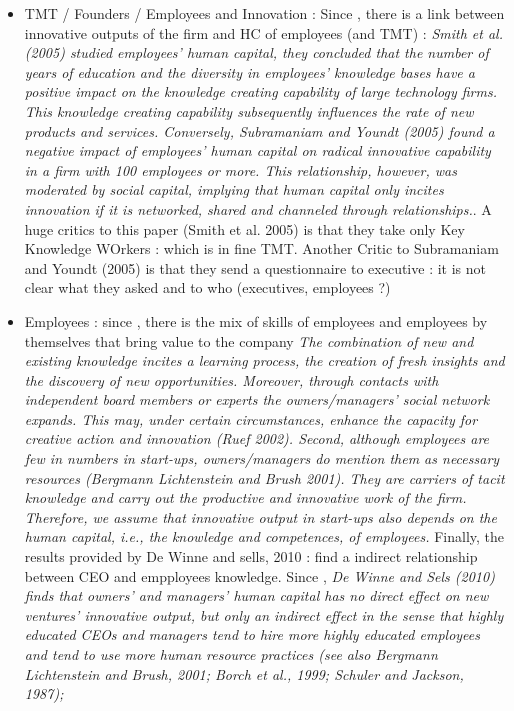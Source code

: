 \begin{itemize}
  \item TMT / Founders / Employees and Innovation : Since \citep{de2010interrelationships}, there is a link between innovative outputs of the firm and HC of employees (and TMT) : \textit{Smith et al. (2005) studied employees’ human capital, they concluded that the number of years of education and the diversity in employees’ knowledge bases have a positive impact on the knowledge creating capability of large technology firms. This knowledge creating capability subsequently influences the rate of new products and services. Conversely, Subramaniam and Youndt (2005) found a negative impact of employees’ human capital on radical innovative capability in a firm with 100 employees or more. This relationship, however, was moderated by social capital, implying that human capital only incites innovation if it is networked, shared and channeled through relationships.}. A huge critics to this paper (Smith et al. 2005) is that they take only Key Knowledge WOrkers : which is in fine TMT. Another Critic to Subramaniam and Youndt (2005) is that they send a questionnaire to executive : it is not clear what they asked and to who (executives, employees ?)\\

  \item Employees : since \citep{de2010interrelationships}, there is the mix of skills of employees and employees by themselves that bring value to the company \textit{The combination of new and existing knowledge incites a learning process, the creation of fresh insights and the discovery of new opportunities. Moreover, through contacts with independent board members or experts the owners/managers’ social network expands. This may, under certain circumstances, enhance the capacity for creative action and innovation (Ruef 2002). Second, although employees are few in numbers in start-ups, owners/managers do mention them as necessary resources (Bergmann Lichtenstein and Brush 2001). They are carriers of tacit knowledge and carry out the productive and innovative work of the firm. Therefore, we assume that innovative output in start-ups also depends on the human capital, i.e., the knowledge and competences, of employees.} Finally, the results provided by De Winne and sells, 2010 : find a indirect relationship between CEO and empployees knowledge. Since \cite{andries2014small}, \textit{De Winne and Sels (2010) finds that owners’ and managers’ human capital has no direct effect on new ventures’ innovative output, but only an indirect effect in the sense that highly educated CEOs and managers tend to hire more highly educated employees and tend to use more human resource practices (see also Bergmann Lichtenstein and Brush, 2001; Borch et al., 1999; Schuler and Jackson, 1987);}\\


\end{itemize}
